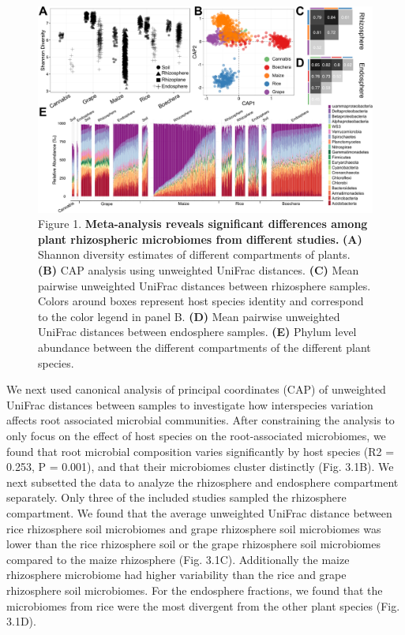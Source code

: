 \begin{figure}[h]
\centering
\includegraphics[width=6in]{Figures/figure2_1}
\caption[Figure 3.1]{Figure 1. \textbf{Meta-analysis reveals significant differences among plant rhizospheric microbiomes from different studies.} \textbf{(A)} Shannon diversity estimates of different compartments of plants. \textbf{(B)} CAP analysis using unweighted UniFrac distances. \textbf{(C)} Mean pairwise unweighted UniFrac distances between rhizosphere samples. Colors around boxes represent host species identity and correspond to the color legend in panel B. \textbf{(D)} Mean pairwise unweighted UniFrac distances between endosphere samples. \textbf{(E)} Phylum level abundance between the different compartments of the different plant species.}
\label{fig.sample_1}
\end{figure}

We next used canonical analysis of principal coordinates (CAP) of unweighted UniFrac distances between samples to investigate how interspecies variation affects root associated microbial communities. After constraining the analysis to only focus on the effect of host species on the root-associated microbiomes, we found that root microbial composition varies significantly by host species (R2 = 0.253, P = 0.001), and that their microbiomes cluster distinctly (Fig. 3.1B). We next subsetted the data to analyze the rhizosphere and endosphere compartment separately. Only three of the included studies sampled the rhizosphere compartment. We found that the average unweighted UniFrac distance between rice rhizosphere soil microbiomes and grape rhizosphere soil microbiomes was lower than the rice rhizosphere soil or the grape rhizosphere soil microbiomes compared to the maize rhizosphere (Fig. 3.1C). Additionally the maize rhizosphere microbiome had higher variability than the rice and grape rhizosphere soil microbiomes. For the endosphere fractions, we found that the microbiomes from rice were the most divergent from the other plant species (Fig. 3.1D).

